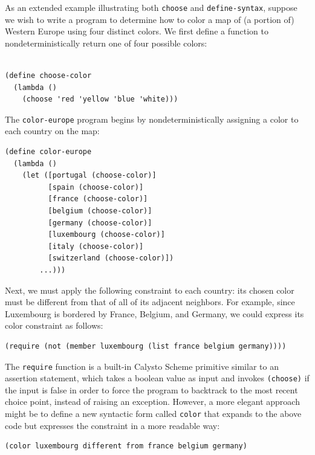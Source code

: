\documentclass[acmsmall,screen,authorversion]{acmart}
\begin{document}
As an extended example illustrating both \texttt{choose} and
\texttt{define-syntax}, suppose we wish to write a program to determine how to
color a map of (a portion of) Western Europe using four distinct colors.  We
first define a function to nondeterministically return one of four possible
colors:\\\\

\vspace{-0.3in}

{\small
\begin{verbatim}
(define choose-color
  (lambda ()
    (choose 'red 'yellow 'blue 'white)))
\end{verbatim}
}

\noindent
The \texttt{color-europe} program begins by nondeterministically assigning a
color to each country on the map:

{\small
\begin{verbatim}
(define color-europe
  (lambda ()
    (let ([portugal (choose-color)]
          [spain (choose-color)]
          [france (choose-color)]
          [belgium (choose-color)]
          [germany (choose-color)]
          [luxembourg (choose-color)]
          [italy (choose-color)]
          [switzerland (choose-color)])
        ...)))
\end{verbatim}
}

\noindent
Next, we must apply the following constraint to each country: its chosen color
must be different from that of all of its adjacent neighbors.  For example,
since Luxembourg is bordered by France, Belgium, and Germany, we could express
its color constraint as follows:

{\small
\begin{verbatim}
(require (not (member luxembourg (list france belgium germany))))
\end{verbatim}
}

\noindent
The \texttt{require} function is a built-in Calysto Scheme primitive similar to
an assertion statement, which takes a boolean value as input and invokes
\texttt{(choose)} if the input is false in order to force the program to
backtrack to the most recent choice point, instead of raising an exception.
However, a more elegant approach might be to define a new syntactic form called
\texttt{color} that expands to the above code but expresses the constraint in a
more readable way:

{\small
\begin{verbatim}
(color luxembourg different from france belgium germany)
\end{verbatim}
}
\end{document}
